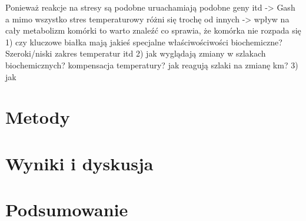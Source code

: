 \documentclass{pracamgr}
\begin{document}
Ponieważ reakcje na stresy są podobne uruachamiają podobne geny itd -> Gash a mimo wszystko stres temperaturowy różni się trochę od innych -> wpływ na cały metabolizm komórki
to warto znaleźć co sprawia, że komórka nie rozpada się
1) czy kluczowe białka  mają jakieś specjalne właściwościwości biochemiczne? Szeroki/niski zakres temperatur itd
2) jak wyglądają zmiany w szlakach biochemicznych? kompensacja temperatury? jak reagują szlaki na zmianę km?
3) jak 	

\chapter{Metody}

\chapter{Wyniki i dyskusja}

\chapter{Podsumowanie}





\end{document}
